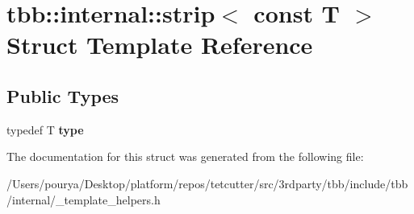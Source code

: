 \hypertarget{structtbb_1_1internal_1_1strip_3_01const_01T_01_4}{}\section{tbb\+:\+:internal\+:\+:strip$<$ const T $>$ Struct Template Reference}
\label{structtbb_1_1internal_1_1strip_3_01const_01T_01_4}
\subsection*{Public Types}
\begin{DoxyCompactItemize}
\item 
\hypertarget{structtbb_1_1internal_1_1strip_3_01const_01T_01_4_ae8d83362bdbf9659c64e9992a2880e3f}{}typedef T {\bfseries type}\label{structtbb_1_1internal_1_1strip_3_01const_01T_01_4_ae8d83362bdbf9659c64e9992a2880e3f}

\end{DoxyCompactItemize}


The documentation for this struct was generated from the following file\+:\begin{DoxyCompactItemize}
\item 
/\+Users/pourya/\+Desktop/platform/repos/tetcutter/src/3rdparty/tbb/include/tbb/internal/\+\_\+template\+\_\+helpers.\+h\end{DoxyCompactItemize}
